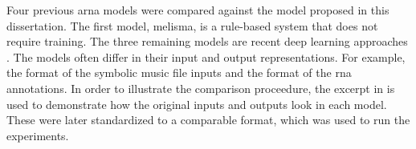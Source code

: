 
Four previous \gls{arna} models were compared against the
model proposed in this dissertation. The first model,
\gls{melisma}, is a rule-based system that does not require
training. The three remaining models are recent deep
learning approaches \parencite{chen2021attend,
micchi2021deep, mcleod2021modular}. The models often differ
in their input and output representations. For example, the
format of the symbolic music file inputs and the format of
the \gls{rna} annotations. In order to illustrate the
comparison proceedure, the excerpt in 
is used to demonstrate how the original inputs and outputs
look in each model. These were later standardized to a
comparable format, which was used to run the experiments.

